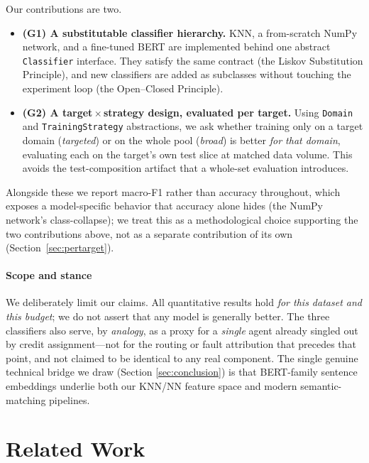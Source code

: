 \documentclass[conference]{IEEEtran}
\begin{document}
Our contributions are two.
\begin{itemize}
  \item \textbf{(G1) A substitutable classifier hierarchy.}
        KNN, a from-scratch NumPy network, and a fine-tuned BERT are
        implemented behind one abstract \texttt{Classifier} interface.
        They satisfy the same contract (the Liskov Substitution
        Principle), and new classifiers are added as subclasses without
        touching the experiment loop (the Open--Closed Principle).
  \item \textbf{(G2) A target\,$\times$\,strategy design, evaluated per
        target.} Using \texttt{Domain} and \texttt{TrainingStrategy}
        abstractions, we ask whether training only on a target domain
        (\emph{targeted}) or on the whole pool (\emph{broad}) is better
        \emph{for that domain}, evaluating each on the target's own test
        slice at matched data volume. This avoids the
        test-composition artifact that a whole-set evaluation introduces.
\end{itemize}
Alongside these we report macro-F1 rather than accuracy throughout, which
exposes a model-specific behavior that accuracy alone hides (the NumPy
network's class-collapse); we treat this as a methodological choice
supporting the two contributions above, not as a separate contribution of
its own (Section~\ref{sec:pertarget}).

\paragraph*{Scope and stance}
We deliberately limit our claims. All quantitative results hold
\emph{for this dataset and this budget}; we do not assert that any model
is generally better. The three classifiers also serve, by
\emph{analogy}, as a proxy for a \emph{single} agent already singled out
by credit assignment---not for the routing or fault attribution that
precedes that point, and not claimed to be identical to any real
component. The single genuine technical bridge we draw (Section
\ref{sec:conclusion}) is that BERT-family sentence embeddings underlie
both our KNN/NN feature space and modern semantic-matching pipelines.

\section{Related Work}
\label{sec:related}
\end{document}
